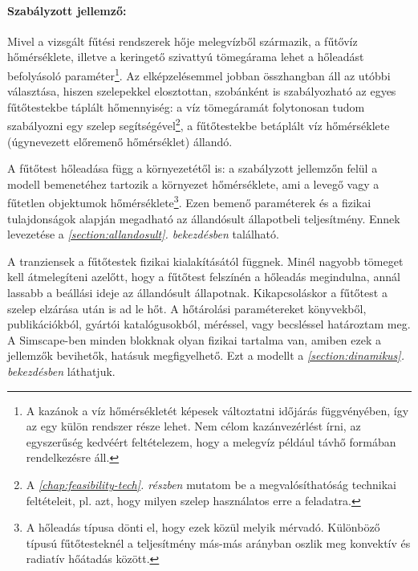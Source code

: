 \paragraph{Szabályzott jellemző:} Mivel a vizsgált fűtési rendszerek hője melegvízből származik, a fűtővíz %
hőmérséklete, illetve a keringető szivattyú tömegárama lehet a hőleadást befolyásoló paraméter\footnote{A kazánok a víz hőmérsékletét képesek változtatni időjárás függvényében, így az egy külön rendszer része lehet. Nem célom kazánvezérlést írni, az egyszerűség kedvéért feltételezem, hogy a melegvíz például távhő formában rendelkezésre áll.}. Az elképzelésemmel jobban összhangban áll az utóbbi választása, hiszen szelepekkel elosztottan, szobánként is szabályozható az egyes fűtőtestekbe táplált hőmennyiség: a víz tömegáramát folytonosan tudom szabályozni egy szelep segítségével\footnote{A \textit{\ref{chap:feasibility-tech}. részben} mutatom be a megvalósíthatóság technikai feltételeit, pl. azt, hogy milyen szelep használatos erre a feladatra.}, a fűtőtestekbe betáplált víz hőmérséklete (úgynevezett előremenő hőmérséklet) állandó.


A fűtőtest hőleadása függ a környezetétől is: a szabályzott jellemzőn felül a modell bemenetéhez tartozik a környezet hőmérséklete, ami a levegő vagy a fűtetlen objektumok hőmérséklete\footnote{A hőleadás típusa dönti el, hogy ezek közül melyik mérvadó. Különböző típusú fűtőtesteknél a teljesítmény más-más arányban oszlik meg konvektív és radiatív hőátadás között.}.
Ezen bemenő paraméterek és a fizikai tulajdonságok alapján megadható az állandósult állapotbeli teljesítmény. Ennek levezetése a \textit{\ref{section:allandosult}. bekezdésben} található.

A tranziensek a fűtőtestek fizikai kialakításától függnek. Minél nagyobb tömeget kell átmelegíteni azelőtt, hogy a fűtőtest felszínén a hőleadás megindulna, annál lassabb a beállási ideje az állandósult állapotnak. Kikapcsoláskor a fűtőtest a szelep elzárása után is ad le hőt. %
A hőtárolási paramétereket könyvekből, publikációkból, gyártói katalógusokból, méréssel, vagy becsléssel határoztam meg. A Simscape-ben minden blokknak olyan fizikai tartalma van, amiben ezek a jellemzők bevihetők, hatásuk megfigyelhető. Ezt a modellt a \textit{\ref{section:dinamikus}. bekezdésben} láthatjuk.

